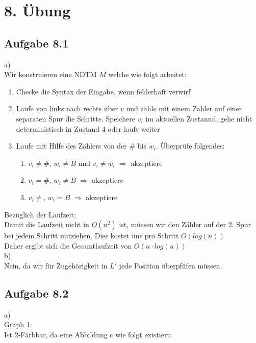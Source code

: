 \section*{8. Übung}
\subsection*{Aufgabe 8.1}

a)\\
Wir konstruieren eine NDTM $M$ welche wie folgt arbeitet:\\
\begin{enumerate}

\item Checke die Syntax der Eingabe, wenn fehlerhaft verwirf
\item Laufe von links nach rechts über $v$ und zähle mit einem Zähler auf einer separaten Spur
die Schritte. Speichere $v_i$ im aktuellen Zustannd, gehe nicht deterministisch in Zustand 4 oder laufe weiter
\item Laufe mit Hilfe des Zählers von der $\#$ bis $w_i$. Überprüfe folgendes:

    \begin{enumerate}

        \item $v_i \not= \#$, $w_i \not= B$ und $v_i \not=w_i$ $\Rightarrow$ akzeptiere
        \item $v_i = \#$, $w_i \not= B$ $\Rightarrow$ akzeptiere
        \item $v_i \not=$, $w_i=B$ $\Rightarrow$ akzeptiere
    \end{enumerate}

\end{enumerate}

Bezüglich der Laufzeit:\\
Damit die Laufzeit nicht in $O(n^2)$ ist, müssen wir den Zähler auf der 2. Spur bei jedem Schritt mitziehen.
Dies kostet uns pro Schritt $O(log(n))$\\
Daher ergibt sich die Gesamtlaufzeit von $O(n \cdot log(n))$\\

b)\\
Nein, da wir für Zugehörigkeit in $L'$ jede Position überpfüfen müssen.

\newpage
\subsection*{Aufgabe 8.2}

a)\\
Graph 1:\\
Ist 2-Färbbar, da eine Abbildung c wie folgt existiert:\\

